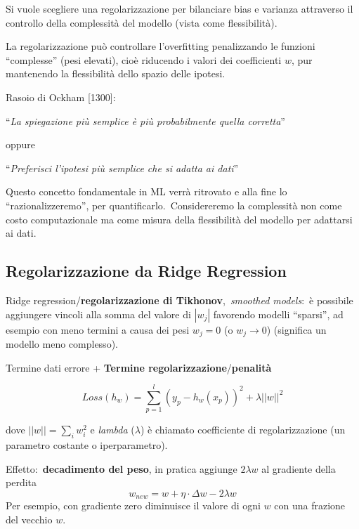 Si vuole scegliere una regolarizzazione per bilanciare bias e varianza attraverso il controllo della complessità del modello (vista come flessibilità).\

La regolarizzazione può controllare l'overfitting penalizzando le funzioni ``complesse'' (pesi elevati), cioè riducendo i valori dei coefficienti $w$, pur mantenendo la flessibilità dello spazio delle ipotesi.

\vspace{12pt}
\noindent Rasoio di Ockham [1300]:
\begin{center}
	``\textit{La spiegazione più semplice è più probabilmente quella corretta}''
\end{center}
oppure
\begin{center}
	``\textit{Preferisci l'ipotesi più semplice che si adatta ai dati}''
\end{center}

\noindent Questo concetto fondamentale in ML verrà ritrovato e alla fine lo ``razionalizzeremo'', per quantificarlo.\
Considereremo la complessità non come costo computazionale ma come misura della flessibilità del modello per adattarsi ai dati.\

\subsection{Regolarizzazione da Ridge Regression}

Ridge regression/\textbf{regolarizzazione di Tikhonov},\ \textit{smoothed models}:\ è possibile aggiungere vincoli alla somma del valore di $|w_j|$ favorendo modelli ``sparsi'', ad esempio con meno termini a causa dei pesi $w_j = 0$ (o $w_j \to 0$) (significa un modello meno complesso).

\begin{flushleft}
	Termine dati errore + \textbf{Termine regolarizzazione}/\textbf{penalità}

	\[Loss(h_w) = \sum_{p=1}^l (y_p - h_w (x_p))^2 + \lambda ||w||^2 \]

	dove $||w|| = \sum_i w_i^2$ e \textit{lambda} ($\lambda$) è chiamato coefficiente di regolarizzazione (un parametro costante o iperparametro).\
\end{flushleft}

\noindent Effetto:\ \textbf{decadimento del peso}, in pratica aggiunge $2\lambda w$ al gradiente della perdita
\[ w_{new} = w + \eta \cdot \Delta w - 2 \lambda w \]
Per esempio, con gradiente zero diminuisce il valore di ogni $w$ con una frazione del vecchio $w$.

